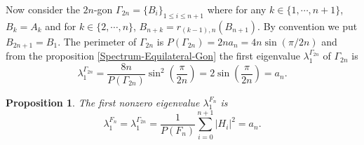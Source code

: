 \documentclass[12pt,english]{smfart} %
\newtheorem{proposition}[theorem]{Proposition}
\theoremstyle{remark}
\begin{document}
\vspace{0.5cm}
Now consider the $2n$-gon $\Gamma_{2n}=\{B_i\}_{1\leqslant i\leqslant n+1}$ where for any $k\in\{1,\cdots,n+1\}$, $B_k=A_k$ and for $k\in\{2,\cdots,n\}$, $B_{n+k}=r_{(k-1),n}(B_{n+1})$. By convention we put $B_{2n+1}=B_1$. The perimeter of $\Gamma_{2n}$ is $P(\Gamma_{2n})=2na_n=4n\sin\left(\pi/2n\right)$ and from the proposition \ref{Spectrum-Equilateral-Gon} the first eigenvalue $\lambda_1^{\Gamma_{2n}}$ of $\Gamma_{2n}$ is 
\begin{equation}\label{Spectrum-Gamma-2n}\lambda_1^{\Gamma_{2n}}=\dfrac{8n}{P(\Gamma_{2n})}\sin^2\left(\dfrac{\pi}{2n}\right)=2\sin\left(\dfrac{\pi}{2n}\right)=a_n.
\end{equation}

\medskip\begin{proposition} The first nonzero eigenvalue $\lambda_1^{F_n}$ is 
$$\lambda_1^{F_n}=\lambda_1^{\Gamma_{2n}}=\frac{1}{P(F_n)}\displaystyle\sum_{i=0}^{n+1}|H_i|^2=a_n.$$
\end{proposition}
\end{document}
